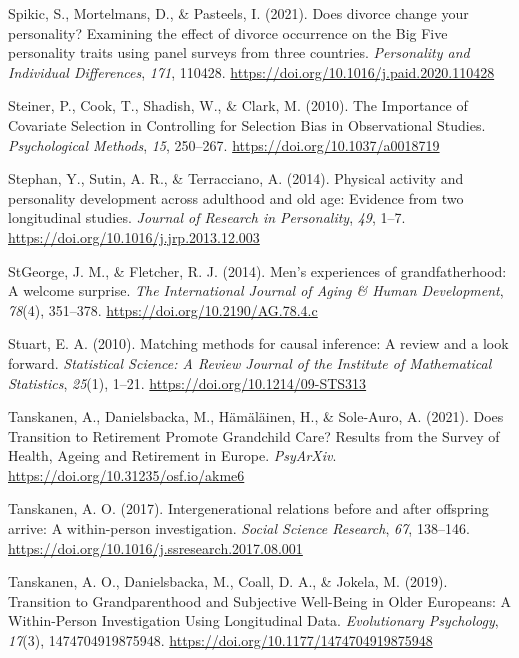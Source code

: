 \documentclass[
  english,
  man,floatsintext]{apa7}
\begin{document}
\leavevmode\hypertarget{ref-spikicDoesDivorceChange2021}{}%
Spikic, S., Mortelmans, D., \& Pasteels, I. (2021). Does divorce change your personality? Examining the effect of divorce occurrence on the Big Five personality traits using panel surveys from three countries. \emph{Personality and Individual Differences}, \emph{171}, 110428. \url{https://doi.org/10.1016/j.paid.2020.110428}

\leavevmode\hypertarget{ref-steinerImportanceCovariateSelection2010}{}%
Steiner, P., Cook, T., Shadish, W., \& Clark, M. (2010). The Importance of Covariate Selection in Controlling for Selection Bias in Observational Studies. \emph{Psychological Methods}, \emph{15}, 250--267. \url{https://doi.org/10.1037/a0018719}

\leavevmode\hypertarget{ref-stephanPhysicalActivityPersonality2014}{}%
Stephan, Y., Sutin, A. R., \& Terracciano, A. (2014). Physical activity and personality development across adulthood and old age: Evidence from two longitudinal studies. \emph{Journal of Research in Personality}, \emph{49}, 1--7. \url{https://doi.org/10.1016/j.jrp.2013.12.003}

\leavevmode\hypertarget{ref-stgeorgeMenExperiencesGrandfatherhood2014}{}%
StGeorge, J. M., \& Fletcher, R. J. (2014). Men's experiences of grandfatherhood: A welcome surprise. \emph{The International Journal of Aging \& Human Development}, \emph{78}(4), 351--378. \url{https://doi.org/10.2190/AG.78.4.c}

\leavevmode\hypertarget{ref-stuartMatchingMethodsCausal2010}{}%
Stuart, E. A. (2010). Matching methods for causal inference: A review and a look forward. \emph{Statistical Science: A Review Journal of the Institute of Mathematical Statistics}, \emph{25}(1), 1--21. \url{https://doi.org/10.1214/09-STS313}

\leavevmode\hypertarget{ref-tanskanenDoesTransitionRetirement2021}{}%
Tanskanen, A., Danielsbacka, M., Hämäläinen, H., \& Sole-Auro, A. (2021). Does Transition to Retirement Promote Grandchild Care? Results from the Survey of Health, Ageing and Retirement in Europe. \emph{PsyArXiv}. \url{https://doi.org/10.31235/osf.io/akme6}

\leavevmode\hypertarget{ref-tanskanenIntergenerationalRelationsOffspring2017}{}%
Tanskanen, A. O. (2017). Intergenerational relations before and after offspring arrive: A within-person investigation. \emph{Social Science Research}, \emph{67}, 138--146. \url{https://doi.org/10.1016/j.ssresearch.2017.08.001}

\leavevmode\hypertarget{ref-tanskanenTransitionGrandparenthoodSubjective2019}{}%
Tanskanen, A. O., Danielsbacka, M., Coall, D. A., \& Jokela, M. (2019). Transition to Grandparenthood and Subjective Well-Being in Older Europeans: A Within-Person Investigation Using Longitudinal Data. \emph{Evolutionary Psychology}, \emph{17}(3), 1474704919875948. \url{https://doi.org/10.1177/1474704919875948}
\end{document}
